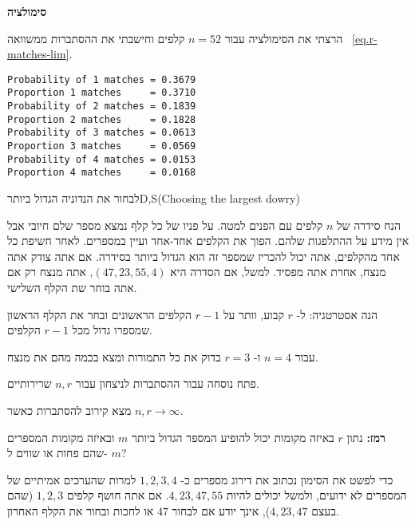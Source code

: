 \textbf{סימולציה}

הרצתי את הסימולציה עבור 
$n=52$
קלפים וחישבתי את ההסתברות ממשוואה%
~\ref{eq.r-matches-lim}.
\begin{verbatim}
Probability of 1 matches = 0.3679
Proportion 1 matches     = 0.3710
Probability of 2 matches = 0.1839
Proportion 2 matches     = 0.1828
Probability of 3 matches = 0.0613
Proportion 3 matches     = 0.0569
Probability of 4 matches = 0.0153
Proportion 4 matches     = 0.0168
\end{verbatim}


\begin{prob}{לבחור את הנדוניה הגדול ביותר}{D,S}{(Choosing the largest dowry)}

הנח סידרה של 
$n$
קלפים עם הפנים למטה. על פניו של כל קלף נמצא מספר שלם חיובי אבל אין מידע על ההתלפגות שלהם. הפוך את הקלפים אחד-אחד ועיין במספרים. לאחר חשיפת כל אחד מהקלפים, אתה יכול להכריז שמספר זה הוא הגדול ביותר בסידרה. אם אתה צודק אתה מנצח, אחרת אתה מפסיד. למשל, אם הסדרה היא 
$(47, 23, 55, 4)$,
אתה מנצח רק אם אתה בוחר שת הקלף השלישי.

הנה אסטרטגיה: ל-%
$r$
קבוע, וותר על
$r-1$
הקלפים הראשונים ובחר את הקלף הראשון שמספרו גדול מכל 
$r-1$
הקלפים.

עבור
$n=4$
ו-%
$r=3$
בדוק את כל התמורות ומצא בכמה מהם את מנצח.

פתח נוסחה עבור ההסתברות לניצחון עבור 
$n, r$
שרירותיים.

 מצא קירוב להסתברות כאשר 
$n,r\rightarrow \infty$.

\textbf{רמז:}
נתון
$r$
באיזה מקומות יכול להופיע המספר הגדול ביותר
$m$
ובאיזה מקומות המספרים שהם פחות או שווים ל-%
$m$? 

\end{prob}

\solution{}

כדי לפשט את הסימון נכתוב את דירוג מספרים כ-%
$1,2,3,4$
למרות שהערכים אמיתיים של המספרים לא ידועים, ולמשל יכולים להיות 
$4,23,47,55$.
אם אתה חושף קלפים
$1,2,3$
(שהם בעצם
$4,23,47$),
אינך יודע אם לבחור
$47$
או לחכות ובחור את הקלף האחרון.

